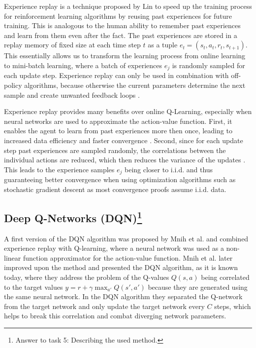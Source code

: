 \documentclass[conference]{IEEEtran}
\begin{document}
Experience replay is a technique proposed by Lin \cite{lin1992} to speed up the training process for reinforcement learning algorithms by reusing past experiences for future training. This is analogous to the human ability to remember past experiences and learn from them even after the fact. The past experiences are stored in a replay memory of fixed size at each time step $t$ as a tuple $e_t = (s_t, a_t, r_t, s_{t+1})$. 
This essentially allows us to transform the learning process from online learning to mini-batch learning, where a batch of experiences $e_j$ is randomly sampled for each update step. Experience replay can only be used in combination with off-policy algorithms, because otherwise the current parameters determine the next sample and create unwanted feedback loops \cite{atari2013,dqn2015}.

Experience replay provides many benefits over online Q-Learning, especially when neural networks are used to approximate the action-value function. 
First, it enables the agent to learn from past experiences more then once, leading to increased data efficiency and faster convergence \cite{lin1992, atari2013}. Second, since for each update step past experiences are sampled randomly, the correlations between the individual actions are reduced, which then reduces the variance of the updates \cite{atari2013}. This leads to the experience samples $e_j$ being closer to i.i.d. and thus guaranteeing better convergence when using optimization algorithms such as stochastic gradient descent as most convergence proofs assume i.i.d. data.

\subsection{Deep Q-Networks (DQN)\footnote{Answer to task 5: Describing the used method.}}

A first version of the DQN algorithm was proposed by Mnih et al. \cite{atari2013} and combined experience replay with Q-learning, where a neural network was used as a non-linear function approximator for the action-value function. Mnih et al. \cite{dqn2015} later improved upon the method and presented the DQN algorithm, as it is known today, where they address the problem of the Q-values $Q(s,a)$ being correlated to the target values $y = r+\gamma \max_{a'} Q(s',a')$ because they are generated using the same neural network. In the DQN algorithm they separated the Q-network from the target network and only update the target network every $C$ steps, which helps to break this correlation and combat diverging network parameters. 
\end{document}
